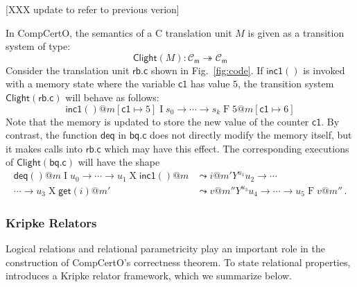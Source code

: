 \documentclass[acmsmall,screen,review,anonymous]{acmart}
\newcommand{\kw}[1]{\ensuremath{ \mathsf{#1} }}
\begin{document}
\begin{example} \label{ex:clightsem} %
[XXX update to refer to previous verion]

In CompCertO,
the semantics of a C translation unit $M$
is given as a transition system of type:
\[
  \kw{Clight}(M) : \mathcal{C}_\kw{m} \twoheadrightarrow \mathcal{C}_\kw{m}
\]
%
Consider the translation unit $\kw{rb.c}$ shown in Fig.~\ref{fig:code}.
If $\kw{inc1}()$ is invoked
with a memory state where the variable $\kw{c1}$ has value $5$,
the transition system $\kw{Clight}(\kw{rb.c})$ will behave as follows:
\[
  \kw{inc1}()@m[\kw{c1} \mapsto 5]
  \mathrel{I}
  s_0 \rightarrow \cdots \rightarrow s_k
  \mathrel{F}
  5@m[\kw{c1} \mapsto 6]
\]
Note that the memory is updated to store the new value of the counter $\kw{c1}$.
By contrast, the function $\kw{deq}$ in $\kw{bq.c}$
does not directly modify the memory itself,
but it makes calls into $\kw{rb.c}$ which may have this effect.
The corresponding executions of $\kw{Clight}(\kw{bq.c})$
will have the shape
\begin{align*}
  \kw{deq}()@m
  \mathrel{I}
  u_0 \rightarrow \cdots \rightarrow u_1
  \mathrel{X}
  \kw{inc1}()@m &\leadsto i@m'
  \mathrel{Y^{u_1}}
  u_2 \rightarrow \cdots \\ \cdots \rightarrow u_3
  \mathrel{X}
  \kw{get}(i)@m' &\leadsto v@m''
  \mathrel{Y^{u_3}}
  u_4 \rightarrow \cdots \rightarrow u_5
  \mathrel{F}
  v@m''
  \,.
\end{align*}
\end{example}

\subsubsection{Kripke Relators} %

Logical relations
and relational parametricity
play an important role
in the construction of CompCertO's correctness theorem.
To state relational properties,
\citet{compcerto}
introduces a Kripke relator framework,
which we summarize below.
\end{document}
